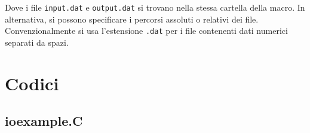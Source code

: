 \documentclass{article}
\newcommand{\ttt}{\texttt}
\begin{document}
Dove i file \ttt{input.dat} e \ttt{output.dat} si trovano nella stessa cartella della macro. In alternativa, si possono specificare i percorsi assoluti o relativi dei file. Convenzionalmente si usa l'estensione \ttt{.dat} per i file contenenti dati numerici separati da spazi.

\newpage
\section{Codici}

\subsection{ioexample.C}

\end{document}
